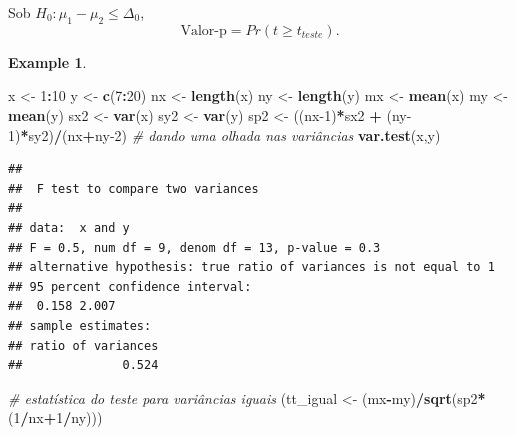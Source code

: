 \documentclass[
]{book}
\newenvironment{Shaded}{\begin{snugshade}}{\end{snugshade}}
\newcommand{\CommentTok}[1]{\textcolor[rgb]{0.56,0.35,0.01}{\textit{#1}}}
\newcommand{\DecValTok}[1]{\textcolor[rgb]{0.00,0.00,0.81}{#1}}
\newcommand{\KeywordTok}[1]{\textcolor[rgb]{0.13,0.29,0.53}{\textbf{#1}}}
\newcommand{\NormalTok}[1]{#1}
\newcommand{\OperatorTok}[1]{\textcolor[rgb]{0.81,0.36,0.00}{\textbf{#1}}}
\newcommand{\StringTok}[1]{\textcolor[rgb]{0.31,0.60,0.02}{#1}}
\theoremstyle{definition}
\theoremstyle{definition}
\newtheorem{example}{Example}[chapter]
\theoremstyle{definition}
\theoremstyle{remark}
\begin{document}
Sob \(H_0: \mu_1-\mu_2 \le \Delta_0\),
\begin{equation}
\text{Valor-p} = Pr(t \ge t_{teste}).
\label{eq:t-teste-media-bi-p-uni-sup}
\end{equation}

\begin{example}
\protect\hypertarget{exm:t-duas-medias-indep}{}{\label{exm:t-duas-medias-indep} }
\end{example}

\begin{Shaded}
\begin{Highlighting}[]
\NormalTok{x \textless{}{-}}\StringTok{ }\DecValTok{1}\OperatorTok{:}\DecValTok{10}
\NormalTok{y \textless{}{-}}\StringTok{ }\KeywordTok{c}\NormalTok{(}\DecValTok{7}\OperatorTok{:}\DecValTok{20}\NormalTok{)}
\NormalTok{nx \textless{}{-}}\StringTok{ }\KeywordTok{length}\NormalTok{(x)}
\NormalTok{ny \textless{}{-}}\StringTok{ }\KeywordTok{length}\NormalTok{(y)}
\NormalTok{mx \textless{}{-}}\StringTok{ }\KeywordTok{mean}\NormalTok{(x)}
\NormalTok{my \textless{}{-}}\StringTok{ }\KeywordTok{mean}\NormalTok{(y)}
\NormalTok{sx2 \textless{}{-}}\StringTok{ }\KeywordTok{var}\NormalTok{(x)}
\NormalTok{sy2 \textless{}{-}}\StringTok{ }\KeywordTok{var}\NormalTok{(y)}
\NormalTok{sp2 \textless{}{-}}\StringTok{ }\NormalTok{((nx}\DecValTok{{-}1}\NormalTok{)}\OperatorTok{*}\NormalTok{sx2 }\OperatorTok{+}\StringTok{ }\NormalTok{(ny}\DecValTok{{-}1}\NormalTok{)}\OperatorTok{*}\NormalTok{sy2)}\OperatorTok{/}\NormalTok{(nx}\OperatorTok{+}\NormalTok{ny}\DecValTok{{-}2}\NormalTok{)}
\CommentTok{\# dando uma olhada nas variâncias}
\KeywordTok{var.test}\NormalTok{(x,y)}
\end{Highlighting}
\end{Shaded}

\begin{verbatim}
## 
##  F test to compare two variances
## 
## data:  x and y
## F = 0.5, num df = 9, denom df = 13, p-value = 0.3
## alternative hypothesis: true ratio of variances is not equal to 1
## 95 percent confidence interval:
##  0.158 2.007
## sample estimates:
## ratio of variances 
##              0.524
\end{verbatim}

\begin{Shaded}
\begin{Highlighting}[]
\CommentTok{\# estatística do teste para variâncias iguais}
\NormalTok{(tt\_igual \textless{}{-}}\StringTok{ }\NormalTok{(mx}\OperatorTok{{-}}\NormalTok{my)}\OperatorTok{/}\KeywordTok{sqrt}\NormalTok{(sp2}\OperatorTok{*}\NormalTok{(}\DecValTok{1}\OperatorTok{/}\NormalTok{nx}\OperatorTok{+}\DecValTok{1}\OperatorTok{/}\NormalTok{ny)))}
\end{Highlighting}
\end{Shaded}
\end{document}
